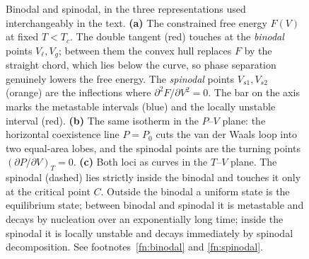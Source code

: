 \documentclass[10pt,a4paper]{article}
\theoremstyle{remark}
\begin{document}
\begin{figure}[htbp]
\vspace{2ex}
\caption{Binodal and spinodal, in the three representations used
interchangeably in the text. \textbf{(a)} The constrained free energy $F(V)$ at
fixed $T<T_c$. The double tangent (red) touches at the \emph{binodal} points
$V_\ell,V_g$; between them the convex hull replaces $F$ by the straight chord,
which lies below the curve, so phase separation genuinely lowers the free energy.
The \emph{spinodal} points $V_{s1},V_{s2}$ (orange) are the inflections where
$\partial^{2}F/\partial V^{2}=0$. The bar on the axis marks the metastable
intervals (blue) and the locally unstable interval (red). \textbf{(b)} The same
isotherm in the $P$--$V$ plane: the horizontal coexistence line $P=P_0$ cuts the
van der Waals loop into two equal-area lobes, and the spinodal points are the
turning points $(\partial P/\partial V)_T=0$. \textbf{(c)} Both loci as curves in
the $T$--$V$ plane. The spinodal (dashed) lies strictly inside the binodal and
touches it only at the critical point $C$. Outside the binodal a uniform state is
the equilibrium state; between binodal and spinodal it is metastable and decays by
nucleation over an exponentially long time; inside the spinodal it is locally
unstable and decays immediately by spinodal decomposition. See
footnotes~\ref{fn:binodal} and \ref{fn:spinodal}.}
\label{fig:binodal}
\end{figure}
\end{document}

